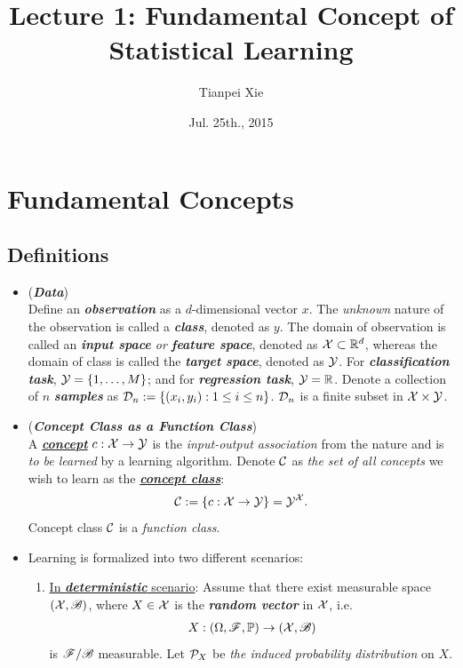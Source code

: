 \documentclass[11pt]{article}
\begin{document}
\title{Lecture 1: Fundamental Concept of Statistical Learning}
\author{ Tianpei Xie}
\date{ Jul. 25th., 2015 }
\maketitle
\tableofcontents
\newpage
\section{Fundamental Concepts}
\subsection{Definitions}
\begin{itemize}
\item \begin{definition} (\emph{\textbf{Data}})\\
Define an \emph{\textbf{observation}} as a $d$-dimensional vector $x$. The \emph{unknown} nature of the observation is called a \emph{\textbf{class}}, denoted as $y$. The domain of observation is called an \emph{\textbf{input space} or \textbf{feature space}}, denoted as ${\mathcal X}\subset {\mathbb R}^{d}$, whereas the domain of class is called the \emph{\textbf{target space}}, denoted as ${\mathcal Y}$. For \emph{\textbf{classification task}}, ${\mathcal Y}= \left\{1,\ldots, M\right\}$; and for \emph{\textbf{regression task}}, ${\mathcal Y} = {\mathbb R}$. 
Denote a collection of $n$ \emph{\textbf{samples}} as ${\mathcal D}_n:= \left\{(x_i, y_i): 1\le i\le n\right\}$. ${\mathcal D}_n$ is a finite subset in ${\mathcal X} \times {\mathcal Y}$.
\end{definition}

\item \begin{definition} (\emph{\textbf{Concept Class as a Function Class}})\\
 A \underline{\emph{\textbf{concept}}} $c: {\mathcal X} \rightarrow {\mathcal Y}$ is the \emph{input-output association} from the nature and is \emph{to be learned} by a learning algorithm.  Denote ${\mathcal C}$ as \emph{the set of all concepts} we wish to learn as the \underline{\emph{\textbf{concept class}}}:
\begin{align*}
{\mathcal C} := \left\{c: {\mathcal X} \rightarrow {\mathcal Y} \right\} ={\mathcal Y}^{{\mathcal X}}.
\end{align*} Concept class ${\mathcal C}$ is a \emph{function class}. 
\end{definition}

\item Learning is formalized into two different scenarios:
\begin{enumerate}
\item \underline{In  \emph{\textbf{deterministic}} scenario}: 
Assume that there exist measurable space $({\mathcal X}, {\mathscr B})$, where $X \in {\mathcal X}$ is the \emph{\textbf{random vector}} in ${\mathcal X}$, i.e. 
\begin{align*}
X: (\Omega, {\mathscr F}, {\mathbb P}) \to ({\mathcal X}, {\mathscr B})
\end{align*} is ${\mathscr F}/{\mathscr B}$ measurable. Let ${\mathcal P}_{X}$ be \emph{the induced probability distribution} on $X$.


\end{enumerate}
\end{itemize}
\end{document}
